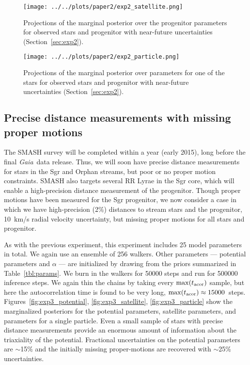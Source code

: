 \documentclass{emulateapj}
\newcommand{\project}[1]{\textsl{#1}}
\newcommand{\gaia}{\project{Gaia}}
\newcommand{\Loffset}{\alpha}
\begin{document}
\begin{figure*}[!h]
\begin{center}
\texttt{[image: ../../plots/paper2/exp2\_satellite.png]}
\caption{ Projections of the marginal posterior over the progenitor parameters for observed stars and progenitor with near-future uncertainties (Section~\ref{sec:exp2}). }\label{fig:exp2_satellite}
\end{center}
\end{figure*}

\begin{figure*}[!h]
\begin{center}
\texttt{[image: ../../plots/paper2/exp2\_particle.png]}
\caption{ Projections of the marginal posterior over parameters for one of the stars for observed stars and progenitor with near-future uncertainties (Section~\ref{sec:exp2}).   }\label{fig:exp2_particle}
\end{center}
\end{figure*}

\subsection{Precise distance measurements with missing proper motions}\label{sec:exp3}
The SMASH survey \citep{smashprop} will be completed within a year (early 2015), long before the final \gaia\, data release. Thus, we will soon have precise distance measurements for stars in the Sgr and Orphan streams, but poor or no proper motion constraints. SMASH also targets several RR Lyrae in the Sgr core, which will enable a high-precision distance measurement of the progenitor. Though proper motions have been measured for the Sgr progenitor, we now consider a case in which we have high-precision (2\%) distances to stream stars and the progenitor, 10~km/s radial velocity uncertainty, but missing proper motions for all stars and progenitor. 

As with the previous experiment, this experiment includes 25 model parameters in total. We again use an ensemble of 256 walkers. Other parameters --- potential parameters and $\Loffset$ --- are initialized by drawing from the priors summarized in Table~\ref{tbl:params}. We burn in the walkers for 50000 steps and run for 500000 inference steps. We again thin the chains by taking every $\max(t_{\rm acor})$ sample, but here the autocorrelation time is found to be very long, $\max(t_{\rm acor}) \approx 15000$~steps. Figures~\ref{fig:exp3_potential}, \ref{fig:exp3_satellite}, \ref{fig:exp3_particle} show the marginalized posteriors for the potential parameters, satellite parameters, and parameters for a single particle. Even a small sample of stars with precise distance measurements provide an enormous amount of information about the triaxiality of the potential. Fractional uncertainties on the potential parameters are $\sim$15\% and the initially missing proper-motions are recovered with $\sim$25\% uncertainties.
\end{document}
